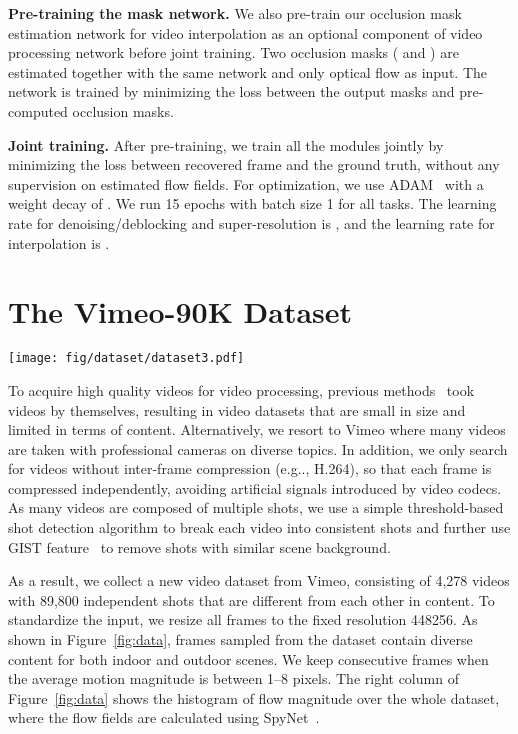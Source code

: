 \documentclass[twocolumn,natbib]{svjour3}          \smartqed  \usepackage{graphicx}
\makeatletter
\newcommand{\fig}[1]{Figure~\ref{#1}}
\def\data{Vimeo-90K\xspace}
\def\procnet{video processing\xspace}
\DeclareRobustCommand\onedot{\futurelet\@let@token\@onedot}
\def\@onedot{\ifx\@let@token.\else.\null\fi\xspace}
\def\eg{e.g\onedot} \def\Eg{E.g\onedot}
\newcommand{\myparagraph}[1]{\vspace{5pt}\noindent\textbf{#1}}
\makeatother
\begin{document}
\myparagraph{Pre-training the mask network. }
We also pre-train our occlusion mask estimation network for video interpolation as an optional component of \procnet network before joint training. Two occlusion masks ( and ) are estimated together with the same network and only optical flow  as input. The network is trained by minimizing the  loss between the output masks and pre-computed occlusion masks.

\myparagraph{Joint training. } After pre-training, we train all the modules jointly by minimizing the  loss between recovered frame and the ground truth, without any supervision on estimated flow fields. For optimization, we use ADAM~\citep{Kingma2015Adam:} with a weight decay of . 
We run 15 epochs with batch size 1 for all tasks. 
The learning rate for denoising/deblocking and super-resolution is , and the learning rate for interpolation is . 
 \section{The \data Dataset}


\begin{figure*}[t]
    \centering
    \texttt{[image: fig/dataset/dataset3.pdf]}
\caption{The \data dataset. (a) Sampled frames from the dataset, which show the high quality and wide coverage of our dataset; (b) The histogram of flow magnitude of all pixels in the dataset; (c) The histogram of mean flow magnitude of all images (the flow magnitude of an image is the average flow magnitude of all pixels in that image).}
    \label{fig:data}
\end{figure*}

 
To acquire high quality videos for video processing, previous methods~\citep{liu2014bayesian,liao2015video} took videos by themselves, resulting in video datasets that are small in size and limited in terms of content. Alternatively, we resort to Vimeo
where many videos are taken with professional cameras on diverse topics. In addition, we only search for videos without inter-frame compression (\eg, H.264), so that each frame is compressed independently, avoiding artificial signals introduced by video codecs. As many videos are composed of multiple shots, we use a simple threshold-based shot detection algorithm to break each video into consistent shots and further use GIST feature~\citep{Oliva2001Modeling} to remove shots with similar scene background.

As a result, we collect a new video dataset from Vimeo, consisting of 4,278 videos with 89,800 independent shots that are different from each other in content.
To standardize the input, we resize all frames to the fixed resolution 448256. As shown in \fig{fig:data}, frames sampled from the dataset contain diverse content for both indoor and outdoor scenes. 
We keep consecutive frames when the average motion magnitude is between 1--8 pixels. The right column of \fig{fig:data} shows the histogram of flow magnitude over the whole dataset, where the flow fields are calculated using SpyNet~\citep{Ranjan2017Optical}.
\end{document}
